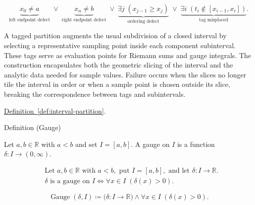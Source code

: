 \begin{remark*}
\[
\underbrace{x_0\ne a}_{\text{left endpoint defect}}
\;\lor\;
\underbrace{x_n\ne b}_{\text{right endpoint defect}}
\;\lor\;
\underbrace{\exists j\;(x_{j-1} \ge x_j)}_{\text{ordering defect}}
\;\lor\;
\underbrace{\exists i\;(t_i \notin [x_{i-1},x_i])}_{\text{tag misplaced}}.
\]
\end{remark*}

\begin{remark*}[Interpretation]
A tagged partition augments the usual subdivision of a closed interval by selecting a representative sampling point inside each component subinterval. These tags serve as evaluation points for Riemann sums and gauge integrals. The construction encapsulates both the geometric slicing of the interval and the analytic data needed for sample values. Failure occurs when the slices no longer tile the interval in order or when a sample point is chosen outside its slice, breaking the correspondence between tags and subintervals.
\end{remark*}

\begin{remark*}[Dependencies]
\hyperref[def:interval-partition]{Definition~\ref*{def:interval-partition}}.
\end{remark*}


\begin{definitionbox}{Definition (Gauge)}
\begin{definition}[Gauge]
\label{def:gauge}
Let $a,b \in \mathbb{R}$ with $a<b$ and set $I=[a,b]$. A gauge on $I$ is a function $\delta:I\to(0,\infty)$.
\end{definition}
\end{definitionbox}

\begin{remark*}
\[
\begin{aligned}
&\text{Let } a,b\in\mathbb{R} \text{ with } a<b, \text{ put } I=[a,b], \text{ and let } \delta:I\to\mathbb{R}.\\
&\delta \text{ is a gauge on } I \Longleftrightarrow \forall x\in I\;(\delta(x)>0).
\end{aligned}
\]
\end{remark*}

\begin{remark*}
\[
\operatorname{Gauge}(\delta,I)
\coloneqq
\bigl(\delta:I\to\mathbb{R}\bigr)
\land
\forall x\in I\;(\delta(x)>0).
\]
\end{remark*}

